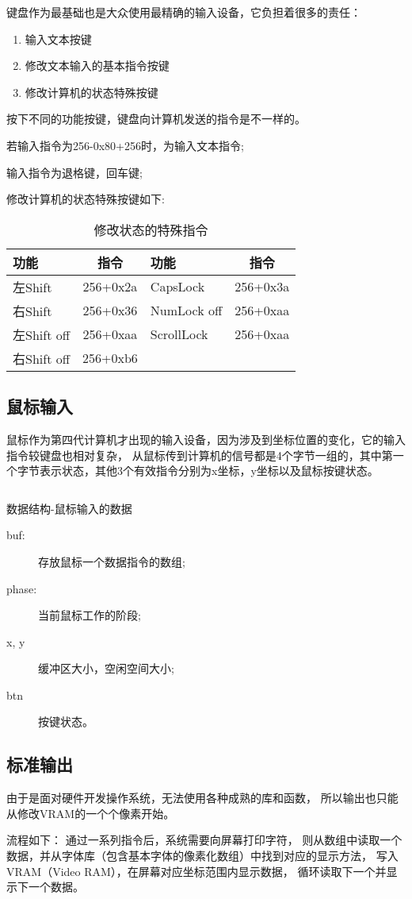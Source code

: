 键盘作为最基础也是大众使用最精确的输入设备，它负担着很多的责任：
\begin{enumerate}
  \item 输入文本按键
  \item 修改文本输入的基本指令按键
  \item 修改计算机的状态特殊按键
\end{enumerate}

按下不同的功能按键，键盘向计算机发送的指令是不一样的。

若输入指令为256-0x80+256时，为输入文本指令;

输入指令为退格键，回车键;

修改计算机的状态特殊按键如下:
\begin{table}[!ht]
  \centering
  \begin{tabular}{|l|c|l|c|}
    \hline 功能 & 指令 & 功能 & 指令 \\
    \hline 左Shift & 256+0x2a & CapsLock & 256+0x3a \\ 
    \hline 右Shift & 256+0x36 & NumLock off & 256+0xaa \\
    \hline 左Shift off & 256+0xaa & ScrollLock & 256+0xaa \\
    \hline 右Shift off & 256+0xb6 & & \\
    \hline
  \end{tabular}
  \caption{修改状态的特殊指令}
  \label{tab:hello}
\end{table}


\subsection{鼠标输入}

鼠标作为第四代计算机才出现的输入设备，因为涉及到坐标位置的变化，它的输入指令较键盘也相对复杂，
从鼠标传到计算机的信号都是4个字节一组的，其中第一个字节表示状态，其他3个有效指令分别为x坐标，y坐标以及鼠标按键状态。

\begin{listing}[H]
  \inputminted[tabsize=2, firstline=126, lastline=129,
  linenos=true]{c}{../ZOS/src/kernel/bootpack.h}
  \caption{数据结构-鼠标输入的数据}
        \label{lst:mouse_data}
\end{listing}
\begin{description}
  \item[buf:]存放鼠标一个数据指令的数组;
  \item[phase:]当前鼠标工作的阶段;
  \item[x, y]缓冲区大小，空闲空间大小;
  \item[btn]按键状态。
\end{description}


\subsection{标准输出}

由于是面对硬件开发操作系统，无法使用各种成熟的库和函数，
所以输出也只能从修改VRAM的一个个像素开始。

流程如下：
通过一系列指令后，系统需要向屏幕打印字符，
则从数组中读取一个数据，并从字体库（包含基本字体的像素化数组）中找到对应的显示方法，
写入VRAM（Video RAM），在屏幕对应坐标范围内显示数据，
循环读取下一个并显示下一个数据。